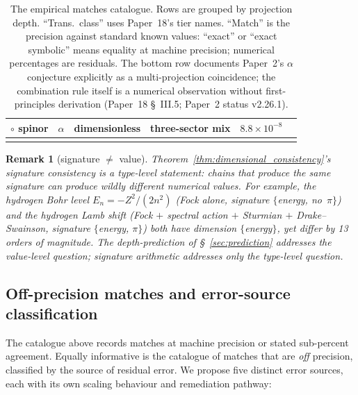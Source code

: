 \documentclass[11pt]{article}
\newtheorem{remark}{Remark}
\begin{document}
\begin{longtable}{p{3.5cm} p{2.8cm} p{1.3cm} p{2.2cm} p{1.8cm} p{1.4cm}}
$\circ$ spinor & $\alpha$ & dimensionless & three-sector mix &
$8.8\!\times\!10^{-8}$ \\
\bottomrule
\caption{The empirical matches catalogue.  Rows are grouped by
projection depth.  ``Trans.\ class'' uses Paper~18's tier names.
``Match'' is the precision against standard known values:
``exact'' or ``exact symbolic'' means equality at machine
precision; numerical percentages are residuals.  The bottom row
documents Paper~2's $\alpha$ conjecture explicitly as a
multi-projection coincidence; the combination rule itself is a
numerical observation without first-principles derivation
(Paper~18 \S~III.5; Paper~2 status v2.26.1).}
\label{tab:catalog}
\end{longtable}

\begin{remark}[signature $\ne$ value]
\label{rem:signature_value}
Theorem~\ref{thm:dimensional_consistency}'s signature consistency is
a type-level statement: chains that produce the same signature can
produce wildly different numerical values.  For example, the
hydrogen Bohr level $E_n = -Z^2/(2n^2)$ (Fock alone, signature
$\{$energy, no~$\pi\}$) and the hydrogen Lamb shift (Fock $+$
spectral action $+$ Sturmian $+$ Drake--Swainson, signature
$\{$energy, $\pi\}$) both have dimension $\{$energy$\}$, yet differ
by 13 orders of magnitude.  The depth-prediction of
\S~\ref{sec:prediction} addresses the value-level question;
signature arithmetic addresses only the type-level question.
\end{remark}

\subsection{Off-precision matches and error-source classification}
\label{sec:offprecision}

The catalogue above records matches at machine precision or stated
sub-percent agreement.  Equally informative is the catalogue of
matches that are \emph{off} precision, classified by the source of
residual error.  We propose five distinct error sources, each with
its own scaling behaviour and remediation pathway:
\end{document}
